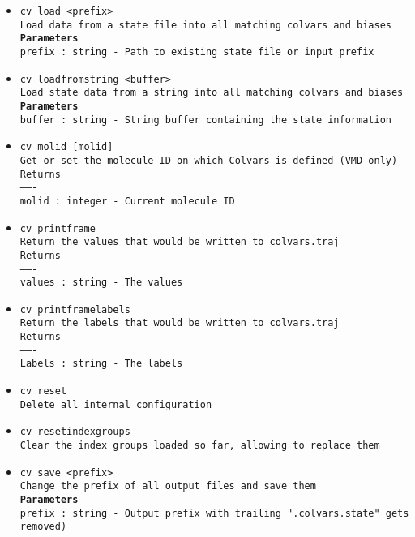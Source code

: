 \begin{itemize}
\item \texttt{cv load <prefix>}
\\
\texttt{Load data from a state file into all matching colvars and biases}
\\
\texttt{\textbf{Parameters}}
\\
\texttt{prefix : string - Path to existing state file or input prefix}
\item \texttt{cv loadfromstring <buffer>}
\\
\texttt{Load state data from a string into all matching colvars and biases}
\\
\texttt{\textbf{Parameters}}
\\
\texttt{buffer : string - String buffer containing the state information}
\item \texttt{cv molid [molid]}
\\
\texttt{Get or set the molecule ID on which Colvars is defined (VMD only)}
\\
\texttt{Returns}
\\
\texttt{-------}
\\
\texttt{molid : integer - Current molecule ID}
\item \texttt{cv printframe}
\\
\texttt{Return the values that would be written to colvars.traj}
\\
\texttt{Returns}
\\
\texttt{-------}
\\
\texttt{values : string - The values}
\item \texttt{cv printframelabels}
\\
\texttt{Return the labels that would be written to colvars.traj}
\\
\texttt{Returns}
\\
\texttt{-------}
\\
\texttt{Labels : string - The labels}
\item \texttt{cv reset}
\\
\texttt{Delete all internal configuration}
\item \texttt{cv resetindexgroups}
\\
\texttt{Clear the index groups loaded so far, allowing to replace them}
\item \texttt{cv save <prefix>}
\\
\texttt{Change the prefix of all output files and save them}
\\
\texttt{\textbf{Parameters}}
\\
\texttt{prefix : string - Output prefix with trailing ".colvars.state" gets removed)}

\end{itemize}
